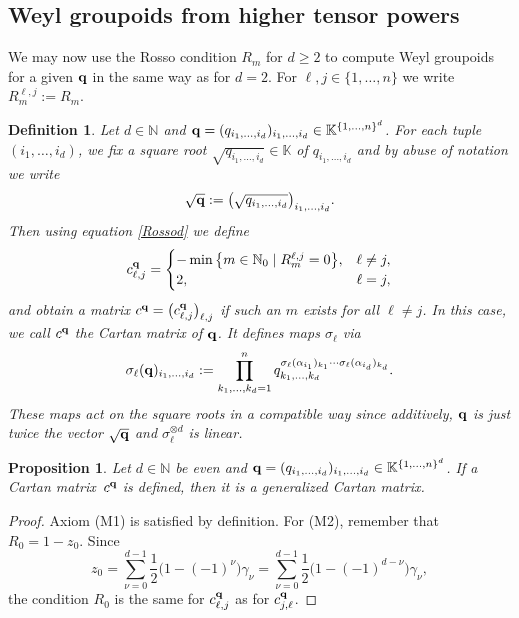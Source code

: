 \documentclass[10pt,a4paper]{amsart}
\numberwithin{equation}{section}
\newtheorem{Proposition}[Theorem]{Proposition}
\newtheorem{Definition}[Theorem]{Definition}
\newcommand{\NN }{\mathbb{N}}
\newcommand{\qq }{{\bf q}}
\newcommand{\KK }{\mathbb{K}}
\newcommand{\dn }{d}
\begin{document}
\subsection{Weyl groupoids from higher tensor powers}
We may now use the Rosso condition $R_m$ for $\dn\ge 2$ to compute Weyl groupoids for a given $\qq$ in the same way as for $\dn=2$.
For $\ell,j\in \{1,\dots,n\}$ we write $R^{\ell,j}_m:=R_m$.

\begin{Definition}\label{cartan_d}
Let $\dn\in\NN$ and
$\qq = (q_{i_1,\dots,i_\dn})_{i_1,\dots,i_\dn}\in \KK^{\{1,\dots,n\}^\dn}$.
For each tuple $(i_1,\dots,i_\dn)$, we fix a square root
$\sqrt{q_{i_1,\dots,i_\dn}}\in\KK$ of $q_{i_1,\dots,i_\dn}$ and
by abuse of notation we write
\[\sqrt{\qq}:=\big(\sqrt{q_{i_1,\dots,i_\dn}}\big)_{i_1,\dots,i_\dn}.\]
Then using equation \eqref{Rossod} we define
\begin{equation*}
c^\qq_{\ell,j} = \begin{cases} -\min\big\{ m\in\NN_0 \mid R^{\ell,j}_m = 0 \big\}, & \ell\ne j, \\
2, & \ell = j, \end{cases}
\end{equation*}
and obtain a matrix $c^\qq=\big(c^\qq_{\ell,j}\big)_{\ell,j}$ if such an $m$ exists for all $\ell\ne j$.
In this case, we call $c^\qq$ the {\it Cartan matrix} of $\qq$.
It defines maps $\sigma_\ell$ via
\[ \sigma_\ell(\qq)_{i_1,\dots,i_\dn} :=
\prod_{k_1,\dots,k_\dn=1}^n q_{k_1,\dots,k_\dn}^{\sigma_\ell(\alpha_{i_1})_{k_1}\cdots \sigma_\ell(\alpha_{i_\dn})_{k_\dn}}. \]
These maps act on the square roots in a compatible way since additively, $\qq$ is just twice the vector $\sqrt{\qq}$ and $\sigma_\ell^{\otimes \dn}$ is linear.
\end{Definition}

\begin{Proposition}\label{RdCartan}
Let $\dn\in \NN$ be even and
$\qq = (q_{i_1,\dots,i_\dn})_{i_1,\dots,i_\dn}\in \KK^{\{1,\dots,n\}^\dn}$.
If a Cartan matrix~$c^\qq$ is defined, then it is a generalized Cartan matrix.
\end{Proposition}
\begin{proof}
Axiom (M1) is satisfied by definition.
For (M2), remember that $R_0 = 1-z_0$. Since
\[z_0 = \sum_{\nu=0}^{d-1} \frac{1}{2}\big(1-(-1)^\nu\big)\gamma_\nu
= \sum_{\nu=0}^{d-1} \frac{1}{2}\big(1-(-1)^{d-\nu}\big)\gamma_\nu, \]
the condition $R_0$ is the same for $c^\qq_{\ell,j}$ as for $c^\qq_{j,\ell}$.
\end{proof}
\end{document}
